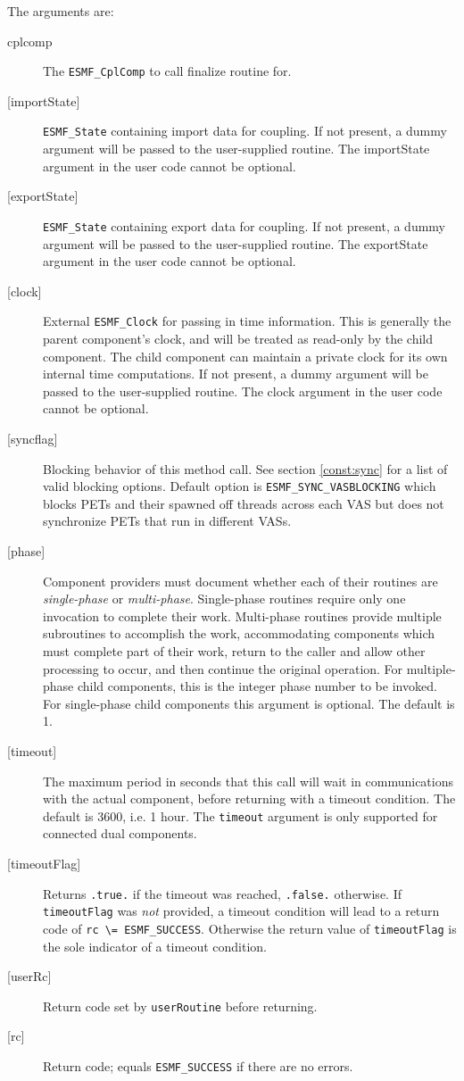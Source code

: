    The arguments are:
   \begin{description}
   \item[cplcomp]
     The {\tt ESMF\_CplComp} to call finalize routine for.
   \item[{[importState]}]
     {\tt ESMF\_State} containing import data for coupling. If not present, a dummy
     argument will be passed to the user-supplied routine.  The
     importState argument in the user code cannot be optional.
   \item[{[exportState]}]
     {\tt ESMF\_State} containing export data for coupling. If not present, a dummy
     argument will be passed to the user-supplied routine.  The
     exportState argument in the user code cannot be optional.
   \item[{[clock]}]
     External {\tt ESMF\_Clock} for passing in time information.
     This is generally the parent component's clock, and will be treated
     as read-only by the child component.  The child component can maintain
     a private clock for its own internal time computations. If not present, a dummy
     argument will be passed to the user-supplied routine.  The
     clock argument in the user code cannot be optional.
   \item[{[syncflag]}]
     Blocking behavior of this method call. See section \ref{const:sync}
     for a list of valid blocking options. Default option is
     {\tt ESMF\_SYNC\_VASBLOCKING} which blocks PETs and their spawned off threads
     across each VAS but does not synchronize PETs that run in different VASs.
   \item[{[phase]}]
     Component providers must document whether each of their
     routines are {\em single-phase} or {\em multi-phase}.
     Single-phase routines require only one invocation to complete
     their work.
     Multi-phase routines provide multiple subroutines to accomplish
     the work, accommodating components which must complete part of their
     work, return to the caller and allow other processing to occur,
     and then continue the original operation.
     For multiple-phase child components, this is the integer phase
     number to be invoked.
     For single-phase child components this argument is optional. The default is
     1.
   \item[{[timeout]}]
     The maximum period in seconds that this call will wait in communications
     with the actual component, before returning with a timeout condition.
     The default is 3600, i.e. 1 hour. The {\tt timeout} argument is only
     supported for connected dual components.
   \item[{[timeoutFlag]}]
     Returns {\tt .true.} if the timeout was reached, {\tt .false.} otherwise.
     If {\tt timeoutFlag} was {\em not} provided, a timeout condition will lead
     to a return code of {\tt rc \textbackslash = ESMF\_SUCCESS}. Otherwise the
     return value of {\tt timeoutFlag} is the sole indicator of a timeout
     condition.
   \item[{[userRc]}]
     Return code set by {\tt userRoutine} before returning.
   \item[{[rc]}]
     Return code; equals {\tt ESMF\_SUCCESS} if there are no errors.
   \end{description}
   
